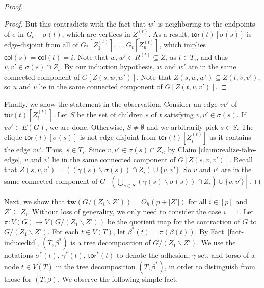 \documentclass[a4paper,11pt]{article}
\numberwithin{lemma}{section}
\newenvironment{claimproof}{\begin{proof}\renewcommand{\qedsymbol}{$\lrcorner$}}{\end{proof}}
\newcommand{\tw}{\mathbf{tw}}
\newcommand{\tor}{\mathsf{tor}}
\begin{document}
\begin{proof}
\begin{claimproof}
But this contradicts with the fact that $w'$ is neighboring to the endpoints of $e$ in $G_t - \sigma(t)$, which are vertices in $Z_1^{(t)}$.
As a result, $\tor(t)[\sigma(s)]$ is edge-disjoint from all of $G_t[Z_1^{(t)}],\dots,G_t[Z_p^{(t)}]$, which implies $\mathsf{col}(s) = \mathsf{col}(t) = i$.
Note that $w,w' \in R^{(t)} \subseteq Z_i$ as $t \in T_i$, and thus $v,v' \in \sigma(s) \cap Z_i$.
By our induction hypothesis, $w$ and $w'$ are in the same connected component of $G[Z(s,w,w')]$.
Note that $Z(s,w,w') \subseteq Z(t,v,v')$, so $u$ and $v$ lie in the same connected component of $G[Z(t,v,v')]$.
\end{claimproof}

Finally, we show the statement in the observation.
Consider an edge $vv'$ of $\tor(t)[Z_i^{(t)}]$.
Let $S$ be the set of children $s$ of $t$ satisfying $v,v' \in \sigma(s)$.
If $vv' \in E(G)$, we are done.
Otherwise, $S \neq \emptyset$ and we arbitrarily pick $s \in S$.
The clique $\tor(t)[\sigma(s)]$ is not edge-disjoint from $\tor(t)[Z_i^{(t)}]$ as it contains the edge $vv'$.
Thus, $s \in T_i$.
Since $v,v' \in \sigma(s) \cap Z_i$, by Claim \ref{claim:realize-fake-edge}, $v$ and $v'$ lie in the same connected component of $G[Z(s,v,v')]$.
Recall that $Z(s,v,v') = ((\gamma(s) \backslash \sigma(s)) \cap Z_i) \cup \{v,v'\}$.
So $v$ and $v'$ are in the same connected component of $G[(\bigcup_{s \in S} (\gamma(s) \backslash \sigma(s)) \cap Z_i) \cup \{v,v'\}]$.
\end{proof}

Next, we show that $\tw(G/(Z_i \backslash Z')) = O_h(p+|Z'|)$ for all $i \in [p]$ and $Z' \subseteq Z_i$.
Without loss of generality, we only need to consider the case $i=1$.
Let $\pi\colon V(G) \rightarrow V(G/(Z_1 \backslash Z'))$ be the quotient map for the contraction of $G$ to $G/(Z_1 \backslash Z')$.
For each $t \in V(T)$, let $\beta^*(t) = \pi(\beta(t))$.
By Fact~\ref{fact-inducedtd}, $(T,\beta^*)$ is a tree decomposition of $G/(Z_1 \backslash Z')$.
We use the notations $\sigma^*(t)$, $\gamma^*(t)$, $\tor^*(t)$ to denote the adhesion, $\gamma$-set, and torso of a node $t \in V(T)$ in the tree decomposition $(T,\beta^*)$, in order to distinguish from those for $(T,\beta)$.
We observe the following simple fact.
\end{document}
